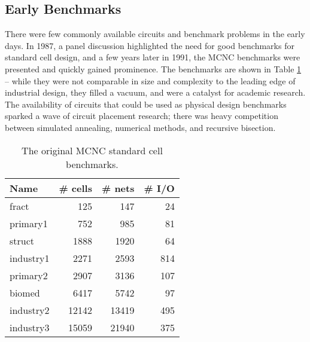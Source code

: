 \documentclass[sigconf]{acmart}
\begin{document}
\iffalse
{\bf Simple Placement Metrics}

As the new benchmarks did not contain functional information,
timing models, and so forth, it was entirely practical to
simplify the file formats so that they were easy to parse.
Much of this work was done as part of the of the
GSRC ``bookshelf''\cite{umichbookshelf}, with many groups
contributing software tools and benchmark problems.

{\bf Complex Placement Metrics}
\fi


\subsection{Early Benchmarks}


There were few commonly available circuits and benchmark problems in
the early days.  In 1987, a panel discussion\cite{Preas87} highlighted
the need for good benchmarks for standard cell design, and a few years
later in 1991, the MCNC benchmarks\cite{Kozminski91} were presented
and quickly gained prominence.  The benchmarks are shown in Table
\ref{tab:mcnc} -- while they were not comparable in size and
complexity to the leading edge of industrial design, they filled a
vacuum, and were a catalyst for academic research.  The availability
of circuits that could be used as physical design benchmarks sparked a
wave of circuit placement research; there was heavy competition
between simulated annealing\cite{Kirkpatrick830671}, numerical methods\cite{Kleinhans910356}, and recursive
bisection\cite{Dunlop850092}.

\begin{table}
  \caption{The original MCNC standard cell
    benchmarks\cite{Kozminski91}.}\label{tab:mcnc}
  \begin{tabular}{|l|r|r|r|} \hline
Name & \# cells & \# nets & \# I/O \\ \hline
    fract   &   125 &   147 & 24 \\ \hline
   primary1 &   752 &   985 & 81 \\ \hline
    struct  &  1888 &  1920 & 64 \\ \hline
  industry1 &  2271 & 2593 & 814 \\ \hline
  primary2 & 2907 & 3136 & 107 \\ \hline
  biomed & 6417 & 5742 & 97 \\ \hline
  industry2 & 12142 & 13419 & 495 \\ \hline
  industry3 & 15059 & 21940 & 375 \\ \hline
  \end{tabular}
\end{table}
\end{document}
